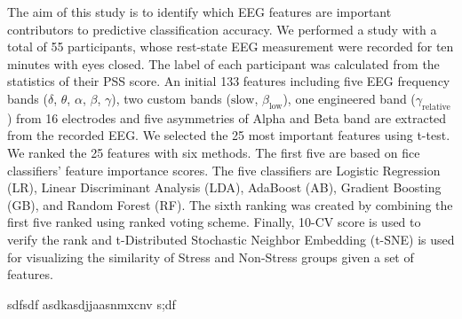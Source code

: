 \documentclass[pdflatex,sn-mathphys]{sn-jnl}%
\theoremstyle{thmstyleone}%
\theoremstyle{thmstyletwo}%
\theoremstyle{thmstylethree}%
\begin{document}
The aim of this study is to identify which EEG features are important contributors to predictive classification accuracy. We performed a study with a total of 55 participants, whose rest-state EEG measurement were recorded for ten minutes with eyes closed. The label of each participant was calculated from the statistics of their PSS score. An initial 133 features including five EEG frequency bands ($\delta$, $\theta$, $\alpha$, $\beta$, $\gamma$), two custom bands ($\text{slow}$, $\beta_{\text{low}}$), one engineered band ($\gamma_{\text{relative}}$) from 16 electrodes and five asymmetries of Alpha and Beta band are extracted from the recorded EEG. We selected the 25 most important features using t-test. We ranked the 25 features with six methods. The first five are based on fice classifiers' feature importance scores. The five classifiers are Logistic Regression (LR), Linear Discriminant Analysis (LDA), AdaBoost (AB), Gradient Boosting (GB), and Random Forest (RF). The sixth ranking was created by combining the first five ranked using ranked voting scheme. Finally, 10-CV score is used to verify the rank and t-Distributed Stochastic Neighbor Embedding (t-SNE) is used for visualizing the similarity of Stress and Non-Stress groups given a set of features.

sdfsdf  asdkasdjjaasnmxcnv s;df

\end{document}
